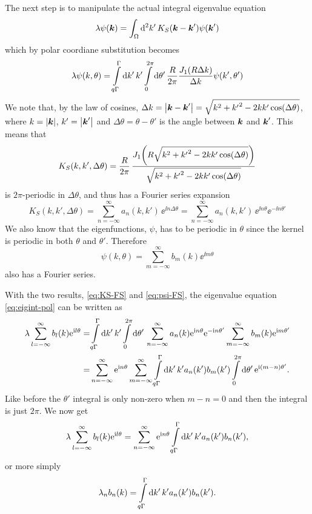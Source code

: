 \documentclass[11pt,a4paper, 
swedish,english %
]{article}
\begin{document}
The next step is to manipulate the actual integral eigenvalue equation
\begin{equation}
\lambda \psi(\vb*k) = \oldint_\Omega \rd^2k'\,
K_S(\vb*k-\vb*k')\psi(\vb*k')
\end{equation}
which by polar coordiane substitution becomes
\begin{equation}\label{eq:eigint-pol}
\lambda\psi(k, \theta) =
\int_{q\Gamma}^\Gamma\rd{k'}\,k'
\int_{0}^{2\pi}\rd\theta'\,\frac{R}{2\pi}
\frac{J_1(R\Delta{k})}{\Delta{k}} \psi(k',\theta')
\end{equation}
We note that, by the law of cosines, 
$\Delta{k}=\abs{\vb*k-\vb*k'}=\sqrt{k^2+{k'}^2-2kk'\cos(\Delta\theta)}$, 
where $k=\abs{\vb*k}$, $k'=\abs{\vb*k'}$ and
$\Delta\theta=\theta-\theta'$ is the angle between $\vb*k$ and
$\vb*k'$. This means that 
\begin{equation}\label{eq:KS-long}
K_S(k, k', \Delta\theta) = \frac{R}{2\pi}\,
\frac{J_1\qty(R\sqrt{k^2+{k'}^2-2kk'\cos(\Delta\theta)})}
{\sqrt{k^2+{k'}^2-2kk'\cos(\Delta\theta)}}
\end{equation}
is $2\pi$-periodic in $\Delta\theta$, and thus has a Fourier series expansion 
\begin{equation} \label{eq:KS-FS}
K_S(k, k', \Delta\theta)  
=\sum_{n=-\infty}^\infty a_{n}(k, k')\, \ee^{\ii n\Delta\theta}
=\sum_{n=-\infty}^\infty a_{n}(k, k')\, \ee^{\ii n\theta}\ee^{-\ii n\theta'}
\end{equation}
We also know that the eigenfunctions, $\psi$, has to be periodic in
$\theta$ since the kernel is periodic in both $\theta$ and
$\theta'$. Therefore 
\begin{equation}\label{eq:psi-FS}
\psi(k, \theta) = \sum_{m=-\infty}^\infty b_m(k)\ee^{\ii m\theta}
\end{equation}
also has a Fourier series. 

With the two results, \eqref{eq:KS-FS} and \eqref{eq:psi-FS}, the
eigenvalue equation \eqref{eq:eigint-pol} can be written as
\begin{equation}
\begin{aligned}
\lambda\sum_{l=-\infty}^\infty b_l(k)\ee^{\ii l\theta}
=& \int_{q\Gamma}^\Gamma\rd{k'}\,k'\int_{0}^{2\pi}\rd\theta'\,
\sum_{n=-\infty}^\infty a_n(k)\ee^{\ii n\theta}\ee^{-\ii n\theta'}
\sum_{m=-\infty}^\infty b_m(k)\ee^{\ii m\theta'}\\
=& \sum_{n=-\infty}^\infty \ee^{\ii n\theta} \sum_{m=-\infty}^\infty 
\int_{q\Gamma}^\Gamma\rd{k'}\,k' a_n(k') b_m(k')
\int_{0}^{2\pi}\rd\theta'\,
\ee^{\ii (m-n)\theta'}.
\end{aligned}
\end{equation}
Like before the $\theta'$ integral is only non-zero when $m-n=0$ and
then the integral is just $2\pi$. We now get
\begin{equation}
\lambda\sum_{l=-\infty}^\infty b_l(k)\ee^{\ii l\theta}
= \sum_{n=-\infty}^\infty \ee^{\ii n\theta} 
\int_{q\Gamma}^\Gamma\rd{k'}\,k' a_n(k') b_n(k'),
\end{equation}
or more simply
\begin{equation}
\lambda_n b_n(k) = \int_{q\Gamma}^\Gamma\rd{k'}\,k' a_n(k') b_n(k').
\end{equation}
\end{document}
